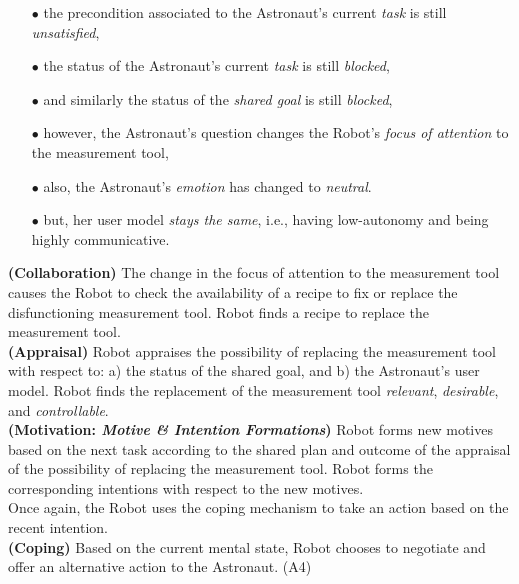 \begin{itemize}
  \item[$\bullet$] the precondition associated to the Astronaut's current
  \textit{task} is still \textit{unsatisfied},
  \item[$\bullet$] the status of the Astronaut's current \textit{task} is still
  \textit{blocked},
  \item[$\bullet$] and similarly the status of the \textit{shared goal} is
  still \textit{blocked},
  \item[$\bullet$] however, the Astronaut's question changes the Robot's
  \textit{focus of attention} to the measurement tool,
  \item[$\bullet$] also, the Astronaut's \textit{emotion} has changed to
  \textit{neutral}.
  \item[$\bullet$] but, her user model \textit{stays the same}, i.e.,
  having low-autonomy and being highly communicative.
\end{itemize}

\noindent\textbf{(Collaboration)} The change in the focus of attention to the
measurement tool causes the Robot to check the availability of a recipe to fix
or replace the disfunctioning measurement tool. Robot finds a recipe to replace
the measurement tool.\\

\noindent\textbf{(Appraisal)} Robot appraises the possibility of
replacing the measurement tool with respect to: a) the status of the shared
goal, and b) the Astronaut's user model. Robot finds the replacement of the
measurement tool \textit{relevant}, \textit{desirable}, and
\textit{controllable}.\\

\noindent\textbf{(Motivation: \textit{Motive \& Intention Formations})} Robot
forms new motives based on the next task according to the shared plan and
outcome of the appraisal of the possibility of replacing the measurement tool.
Robot forms the corresponding intentions with respect to the new motives.\\

Once again, the Robot uses the coping mechanism to take an action based on the
recent intention.\\

\noindent\textbf{(Coping)} Based on the current mental state, Robot
chooses to negotiate and offer an alternative action to the Astronaut. (A4)\\

